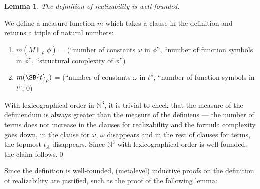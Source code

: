 \documentclass{LMCS}
\newtheorem{lemma}[thm]{Lemma}
\newcommand{\nat}{\ensuremath{\mathbb{N}}}
\newcommand\reals{\ensuremath{\Vdash}}
\begin{document}
\begin{lemma}
The definition of realizability is well-founded. 
\end{lemma}
\proof We define a measure function $m$ which takes a clause in the
definition and returns a triple of natural numbers:
\begin{enumerate}[$\bullet$]
\item $m(M \reals_\rho \phi)$ = (``number of constants $\omega$ in $\phi$'',
``number of function symbols in $\phi$'', ``structural complexity of $\phi$'')
\item $m(\SB{t}_\rho)$ = (``number of constants $\omega$ in $t$'', ``number of function symbols in $t$'', 0)
\end{enumerate}
With lexicographical order in $\nat^3$, it is trivial to check that the measure
of the definiendum is always greater than the measure of the definiens ---
the number of terms does not increase in the clauses for realizability and
the formula complexity goes down, in the clause for $\omega$, $\omega$ disappears and in the rest of clauses for terms,
the topmost $t_A$ disappears. Since $\nat^3$ with lexicographical order is
well-founded, the claim follows.\qed


Since the definition is well-founded, (metalevel) inductive proofs on the
definition of realizability are justified, such as the proof of the following lemma:
\end{document}
